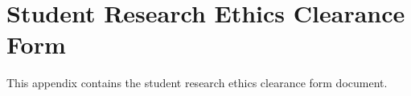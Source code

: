 %
%
%                 

\chapter{Student Research Ethics Clearance Form}
\label{sec:appendixd}

This appendix contains the student research ethics clearance form document. 



